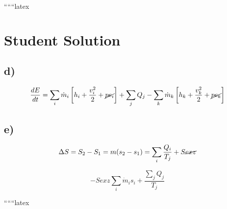``````latex


\section*{Student Solution}

\subsection*{d)}

\[
\frac{dE}{dt} = \sum_i \dot{m}_i \left[ h_i + \frac{v_i^2}{2} + \cancel{pe_i} \right] + \sum_j Q_j - \sum_k \dot{m}_k \left[ h_k + \frac{v_k^2}{2} + \cancel{pe_k} \right]
\]

\subsection*{e)}

\[
\Delta S = S_2 - S_1 = m (s_2 - s_1) = \sum_i \frac{Q_i}{T_j} + S \cancel{e x z}
\]

\[
- S e x z \sum_i \dot{m}_i s_i + \frac{\sum_j Q_j}{T_j}
\]

``````latex


